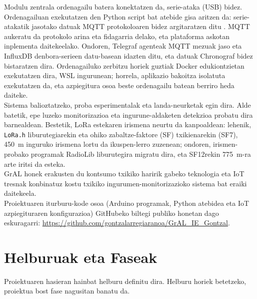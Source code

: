 \documentclass[10pt]{article}
\newcommand{\acpar}[1]{(\acs{#1})\acused{#1}}
\begin{document}
Modulu zentrala ordenagailu batera konektatzen da, serie-ataka (\acs{USB}) bidez. Ordenagailuan exekutatzen den Python script bat atebide gisa aritzen da: serie-atakatik jasotako datuak \ac{MQTT} protokoloaren bidez argitaratzen ditu \cite{soni2017survey}. \ac{MQTT} aukeratu da protokolo arina eta fidagarria delako, eta plataforma askotan inplementa daitekeelako. Ondoren, Telegraf agenteak \cite{chan2019resource} \ac{MQTT} mezuak jaso eta InfluxDB denbora-serieen datu-basean \cite{naqvi2017time} idazten ditu, eta datuak Chronograf bidez bistaratzen dira. Ordenagailuko zerbitzu horiek guztiak Docker \cite{nickoloff2019docker} edukiontzietan exekutatzen dira, \ac{WSL} ingurunean; horrela, aplikazio bakoitza isolatuta exekutatzen da, eta azpiegitura osoa beste ordenagailu batean berriro heda daiteke.\\

Sistema balioztatzeko, proba esperimentalak eta landa-neurketak egin dira. Alde batetik, epe luzeko monitorizazioa eta ingurune-aldaketen detekzioa probatu dira barnealdean. Bestetik, \ac{LoRa} estekaren irismena neurtu da kanpoaldean: lehenik, \texttt{LoRa.h} liburutegiarekin eta ohiko zabaltze-faktore \acpar{SF} txikienarekin (SF7), 450~m inguruko irismena lortu da ikuspen-lerro zuzenean; ondoren, irismen-probako programak RadioLib liburutegira \cite{radiolib} migratu dira, eta SF12rekin 775~m-ra arte iritsi da esteka.\\

\ac{GrAL} honek erakusten du kontsumo txikiko haririk gabeko teknologia eta \ac{IoT} tresnak konbinatuz kostu txikiko ingurumen-monitorizazioko sistema bat eraiki daitekeela.\\

\noindent Proiektuaren iturburu-kode osoa (Arduino programak, Python atebidea eta \ac{IoT} azpiegituraren konfigurazioa) GitHubeko biltegi publiko honetan dago eskuragarri: \url{https://github.com/gontzalarregiaranoa/GrAL_IE_Gontzal}.\\

\clearpage
\section{Helburuak eta Faseak}

Proiektuaren hasieran hainbat helburu definitu dira. Helburu horiek betetzeko, proiektua bost fase nagusitan banatu da.\\

\end{document}
